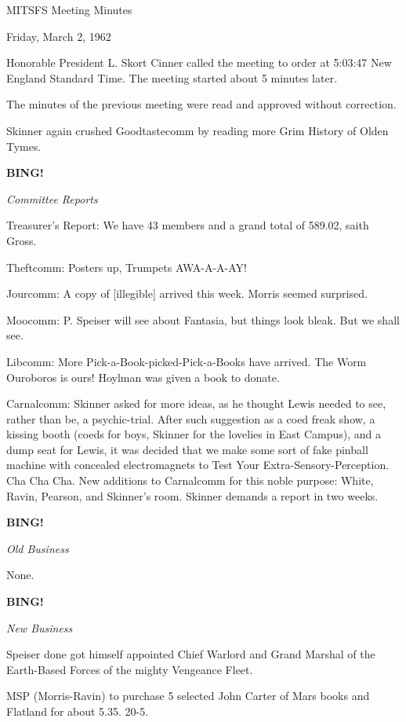 \documentclass[12pt]{article}
\newcommand{\bing}{{\bf BING!} }
\newcommand{\goto}[1]{\bing \vskip 12pt \centerline{{\em{#1}}}}
\begin{document}
\begin{center}

MITSFS Meeting Minutes

Friday, March 2, 1962

\end{center}
 
\vspace{12pt}

\setlength{\parskip}{6pt}

\noindent
Honorable President L. Skort Cinner called the meeting to order at 5:03:47 New England Standard Time. The meeting started about 5 minutes later.

The minutes of the previous meeting were read and approved without correction.

Skinner again crushed Goodtastecomm by reading more Grim History of Olden Tymes.

\goto{Committee Reports}

Treasurer's Report: We have 43 members and a grand total of 589.02, saith Gross.

Theftcomm: Posters up, Trumpets AWA-A-A-AY!

Jourcomm: A copy of [illegible] arrived this week. Morris seemed surprised.

Moocomm: P. Speiser will see about Fantasia, but things look bleak. But we shall see.

Libcomm: More Pick-a-Book-picked-Pick-a-Books have arrived. The Worm Ouroboros is ours! Hoylman was given a book to donate.

Carnalcomm: Skinner asked for more ideas, as he thought Lewis needed to see, rather than be, a psychic-trial. After such suggestion as a coed freak show, a kissing booth (coeds for boys, Skinner for the lovelies in East Campus), and a dump seat for Lewis, it was decided that we make some sort of fake pinball machine with concealed electromagnets to Test Your Extra-Sensory-Perception. Cha Cha Cha. New additions to Carnalcomm for this noble purpose: White, Ravin, Pearson, and Skinner's room. Skinner demands a report in two weeks.

\goto{Old Business}

None.

\goto{New Business}

Speiser done got himself appointed Chief Warlord and Grand Marshal of the Earth-Based Forces of the mighty Vengeance Fleet.

MSP (Morris-Ravin) to purchase 5 selected John Carter of Mars books and Flatland for about 5.35. 20-5.
\end{document}
